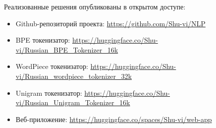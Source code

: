 \documentclass[a4paper,article]{article}
\theoremstyle{mystyle}
\newcommand{\mystyleitemize}[1]{
  \begin{itemize}[label=--, 
				leftmargin=0pt,%
    				labelindent=\parindent,%
    				labelsep=1cm,%
    				itemindent=*,%
    				nolistsep%
    				]
    #1
  \end{itemize}
}
\begin{document}
\begin{sloppypar}
		Реализованные решения опубликованы в открытом доступе:
		
		\mystyleitemize{
    			\item Github-репозиторий проекта: \url{https://github.com/Shu-vi/NLP}
    			\item BPE токенизатор: \url{https://huggingface.co/Shu-vi/Russian_BPE_Tokenizer_16k}
    			\item WordPiece токенизатор: \url{https://huggingface.co/Shu-vi/Russian_wordpiece_tokenizer_32k}
    			\item Unigram токенизатор: \url{https://huggingface.co/Shu-vi/Russian_Unigram_Tokenizer_16k}
    			\item Веб-приложение: \url{https://huggingface.co/spaces/Shu-vi/web-app}
		}
    		
\end{sloppypar}
\end{document}
